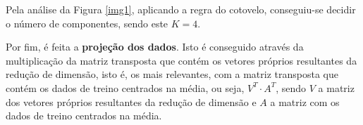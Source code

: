 \noindent Pela análise da Figura \ref{img1}, aplicando a regra do cotovelo, conseguiu-se decidir o número de componentes, sendo este $K = 4$. 

\vspace{0.5em}

\par Por fim, é feita a \textbf{projeção dos dados}. Isto é conseguido através da multiplicação da matriz transposta que contém os vetores próprios resultantes da redução de dimensão, isto é, os mais relevantes, com a matriz transposta que contém os dados de treino centrados na média, ou seja, $V^T \cdot A^T$, sendo $V$ a matriz dos vetores próprios resultantes da redução de dimensão e $A$ a matriz com os dados de treino centrados na média. 